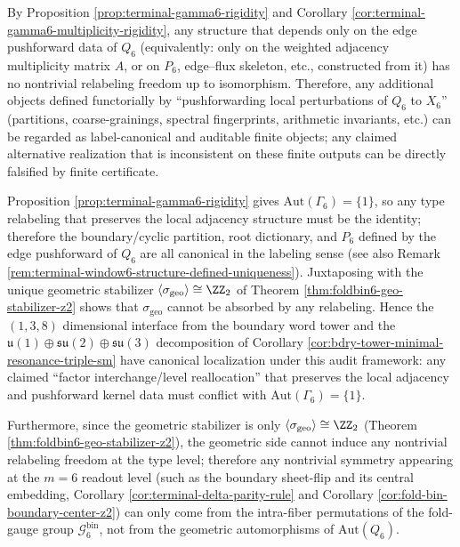\begin{remark}\label{rem:terminal-window6-structure-defined-uniqueness}
By Proposition \ref{prop:terminal-gamma6-rigidity} and Corollary \ref{cor:terminal-gamma6-multiplicity-rigidity}, any structure that depends only on the edge pushforward data of \(Q_6\) (equivalently: only on the weighted adjacency multiplicity matrix \(A\), or on \(P_6\), edge--flux skeleton, etc., constructed from it) has no nontrivial relabeling freedom up to isomorphism.
Therefore, any additional objects defined functorially by ``pushforwarding local perturbations of \(Q_6\) to \(X_6\)'' (partitions, coarse-grainings, spectral fingerprints, arithmetic invariants, etc.) can be regarded as label-canonical and auditable finite objects; any claimed alternative realization that is inconsistent on these finite outputs can be directly falsified by finite certificate.
\end{remark}

\begin{remark}\label{rem:window6-no-relabeling-factor-localization}
Proposition \ref{prop:terminal-gamma6-rigidity} gives \(\mathrm{Aut}(\Gamma_6)=\{1\}\), so any type relabeling that preserves the local adjacency structure must be the identity;
therefore the boundary/cyclic partition, root dictionary, and \(P_6\) defined by the edge pushforward of \(Q_6\) are all canonical in the labeling sense (see also Remark \ref{rem:terminal-window6-structure-defined-uniqueness}).
Juxtaposing with the unique geometric stabilizer \(\langle\sigma_{\mathrm{geo}}\rangle\cong\ZZ_2\) of Theorem \ref{thm:foldbin6-geo-stabilizer-z2} shows that
\(\sigma_{\mathrm{geo}}\) cannot be absorbed by any relabeling.
Hence the \((1,3,8)\) dimensional interface from the boundary word tower and the
\(\mathfrak u(1)\oplus\mathfrak{su}(2)\oplus\mathfrak{su}(3)\) decomposition of Corollary \ref{cor:bdry-tower-minimal-resonance-triple-sm} have canonical localization under this audit framework:
any claimed ``factor interchange/level reallocation'' that preserves the local adjacency and pushforward kernel data must conflict with \(\mathrm{Aut}(\Gamma_6)=\{1\}\).
\par
Furthermore, since the geometric stabilizer is only \(\langle\sigma_{\mathrm{geo}}\rangle\cong\ZZ_2\) (Theorem \ref{thm:foldbin6-geo-stabilizer-z2}),
the geometric side cannot induce any nontrivial relabeling freedom at the type level;
therefore any nontrivial symmetry appearing at the \(m=6\) readout level (such as the boundary sheet-flip and its central embedding, Corollary \ref{cor:terminal-delta-parity-rule} and Corollary \ref{cor:fold-bin-boundary-center-z2})
can only come from the intra-fiber permutations of the fold-gauge group \(\mathcal{G}^{\mathrm{bin}}_6\), not from the geometric automorphisms of \(\mathrm{Aut}(Q_6)\).
\end{remark}

